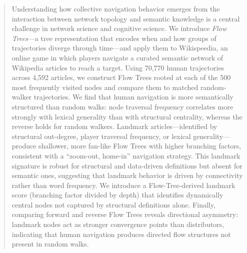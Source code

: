 


\begin{abstract}
Understanding how collective navigation behavior emerges from the interaction between
network topology and semantic knowledge is a central challenge in network science and
cognitive science.
We introduce \textit{Flow Trees}---a tree representation that encodes when and how
groups of trajectories diverge through time---and apply them to Wikispeedia, an
online game in which players navigate a curated semantic network of Wikipedia articles
to reach a target.
Using 70,770 human trajectories across 4,592 articles, we construct Flow Trees rooted
at each of the 500 most frequently visited nodes and compare them to matched
random-walker trajectories.
We find that human navigation is more semantically structured than random walks:
node traversal frequency correlates more strongly with lexical generality than with
structural centrality, whereas the reverse holds for random walkers.
Landmark articles---identified by structural out-degree, player traversal frequency,
or lexical generality---produce shallower, more fan-like Flow Trees with higher
branching factors, consistent with a ``zoom-out, home-in'' navigation strategy.
This landmark signature is robust for structural and data-driven definitions but
absent for semantic ones, suggesting that landmark behavior is driven by connectivity
rather than word frequency.
We introduce a Flow-Tree-derived landmark score (branching factor divided by depth)
that identifies dynamically central nodes not captured by structural definitions alone.
Finally, comparing forward and reverse Flow Trees reveals directional asymmetry:
landmark nodes act as stronger convergence points than distributors, indicating that
human navigation produces directed flow structures not present in random walks.
\end{abstract}


